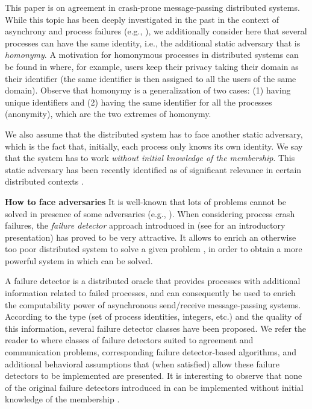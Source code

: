 \documentclass[10pt, conference, compsocconf]{IEEEtran}
\newcommand{\tightparagraph}[1]{\smallskip \noindent \textbf{#1} \hspace{1ex}}
\begin{document}
This paper is on agreement in  crash-prone  message-passing  distributed
systems. While  this topic  has been deeply  investigated in  the past
in the context of asynchrony and process failures 
(e.g., \cite{L96,R10}), we additionally consider here that 
several  processes can have  the  same identity,  i.e.,  the  
additional static adversary  that is {\it homonymy}. 
A motivation for homonymous processes in distributed 
systems can be found in \cite{DFGKRT11} where, for example, 
users keep their privacy taking their domain as their identifier 
(the same identifier is then
assigned to all the users of the same domain). Observe that 
homonymy is a generalization
of two cases: (1) having unique identifiers and 
(2) having the same identifier for all the processes (anonymity), 
which are the two extremes of homonymy.


We also assume  that the distributed system has to face
another static adversary, which is the fact that, initially, 
each process only 
knows its own identity. We say that the system has to work 
\emph{without initial knowledge of the membership}. 
This static adversary has been recently identified 
as of significant relevance in certain distributed contexts
\cite{DBLP:journals/ipl/JimenezAF06}.


\tightparagraph{How to face adversaries}
It is well-known that lots of problems cannot be solved in 
presence of some adversaries 
(e.g., \cite{DBLP:conf/stoc/Angluin80,DBLP:journals/jacm/AttiyaSW88,
DBLP:journals/jacm/FischerLP85,DBLP:journals/tpds/YamashitaK96}). 
When  considering  process  crash  failures,  the  
{\it  failure  detector} approach introduced in 
\cite{DBLP:journals/jacm/ChandraHT96,DBLP:journals/jacm/ChandraT96} 
(see  \cite{R09}   for an 
introductory presentation) has  proved to be very attractive.  
It allows to enrich an otherwise too poor distributed  system 
to solve a given problem ,  in order to obtain a more powerful system 
in which  can be solved. 

A failure detector is a  distributed oracle  that provides processes with
additional information related to  failed processes, and can consequently be
used to enrich the computability power of asynchronous  send/receive 
message-passing systems.
According to the  type (set  of process  identities, integers,
etc.) and  the quality  of  this  information,  several failure  detector
classes have been proposed. 
We refer the reader to  \cite{R10} where classes of 
failure detectors  suited to  agreement and communication
problems, corresponding failure detector-based algorithms, and 
additional behavioral assumptions that (when satisfied) allow 
these failure detectors to be implemented are presented.
It is interesting to observe that none of the original failure detectors
introduced in \cite{DBLP:journals/jacm/ChandraT96} can be implemented
without initial knowledge of the 
membership \cite{DBLP:journals/ipl/JimenezAF06}.
\end{document}
